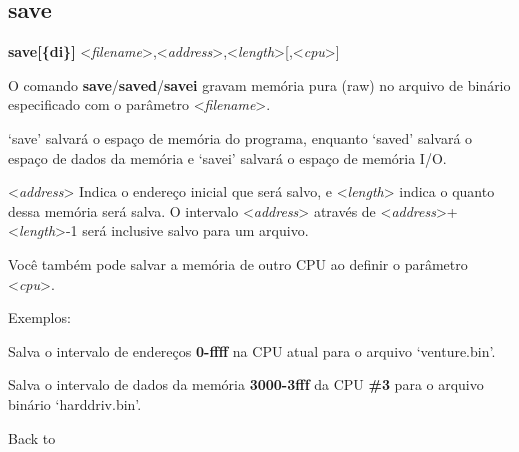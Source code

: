 \documentclass[letterpaper,10pt,brazil]{sphinxmanual}
\begin{document}
\subsection{save}
\label{debugger/memory:save}\label{debugger/memory:debugger-command-save}
\begin{DUlineblock}{0em}
\item[]
\begin{DUlineblock}{\DUlineblockindent}
\item[] \textbf{save{[}\{d\textbar{}i\}{]}} \textless{}\emph{filename}\textgreater{},\textless{}\emph{address}\textgreater{},\textless{}\emph{length}\textgreater{}{[},\textless{}\emph{cpu}\textgreater{}{]}
\item[] 
\end{DUlineblock}
\item[] O comando \textbf{save}/\textbf{saved}/\textbf{savei} gravam memória pura (raw) no arquivo de binário especificado com o parâmetro \textless{}\emph{filename}\textgreater{}.
\item[] `save' salvará o espaço de memória do programa, enquanto `saved' salvará o espaço de dados da memória e `savei' salvará o espaço de memória I/O.
\item[] \textless{}\emph{address}\textgreater{} Indica o endereço inicial que será salvo, e \textless{}\emph{length}\textgreater{} indica o quanto dessa memória será salva. O intervalo \textless{}\emph{address}\textgreater{} através de \textless{}\emph{address}\textgreater{}+\textless{}\emph{length}\textgreater{}-1 será inclusive salvo para um arquivo.
\item[] Você também pode salvar a memória de outro CPU ao definir o parâmetro \textless{}\emph{cpu}\textgreater{}.
\item[] 
\item[] 
\item[] Exemplos:
\item[] 
\item[]
\begin{DUlineblock}{\DUlineblockindent}
\item[] 
\item[] 
\end{DUlineblock}
\item[] Salva o intervalo de endereços \textbf{0-ffff} na CPU atual para o arquivo `venture.bin'.
\item[] 
\item[]
\begin{DUlineblock}{\DUlineblockindent}
\item[] 
\item[] 
\end{DUlineblock}
\item[] Salva o intervalo de dados da memória \textbf{3000-3fff} da CPU \textbf{\#3} para o arquivo binário `harddriv.bin'.
\item[] 
\item[] Back to {\hyperref[debugger/memory:debugger\string-memory\string-list]{}}
\end{DUlineblock}
\end{document}
